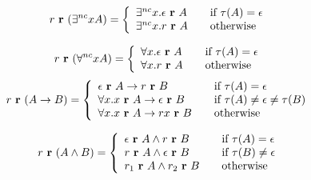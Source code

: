 \[ r \ \textbf{r} \ (\exists^{nc} x A) = \left\{ 
\begin{array}{l l}
\exists^{nc} x. \epsilon \ \textbf{r} \ A & \quad \text{if $\tau (A) = \epsilon$} \\ 
\exists^{nc} x. r \ \textbf{r} \ A & \quad \text{otherwise} \\

\end{array} \right.
\]

\[ r \ \textbf{r} \ (\forall^{nc} x A) = \left\{ 
\begin{array}{l l}
\forall x. \epsilon \ \textbf{r} \ A & \quad \text{if $\tau (A) = \epsilon$} \\ 
\forall x. r \ \textbf{r} \ A & \quad \text{otherwise} \\

\end{array} \right.
\]
\[ r \ \textbf{r} \ (A \to B) = \left\{ 
\begin{array}{l l}
\epsilon \ \textbf{r} \ A \to r \ \textbf{r} \ B & \quad \text{if $\tau (A) = \epsilon$} \\ 
\forall x.x \ \textbf{r} \ A \to \epsilon \ \textbf{r} \ B & \quad \text{if
  $\tau (A) \neq \epsilon \neq \tau (B)$} \\
\forall x. x \ \textbf{r} \ A \to r x  \ \textbf{r} \ B & \quad \text{otherwise} \\

\end{array} \right.
\]

\[ r \ \textbf{r} \ (A \wedge B) = \left\{ 
\begin{array}{l l}
\epsilon \ \textbf{r} \ A  \wedge r \ \textbf{r} \ B & \quad \text{if $\tau (A) = \epsilon$} \\ 
r \ \textbf{r} \ A \wedge \epsilon \ \textbf{r} \ B & \quad \text{if
  $\tau (B) \neq \epsilon$} \\
r_1 \ \textbf{r} \ A \wedge r_2  \ \textbf{r} \ B & \quad \text{otherwise} \\

\end{array} \right.
\]



\medskip

